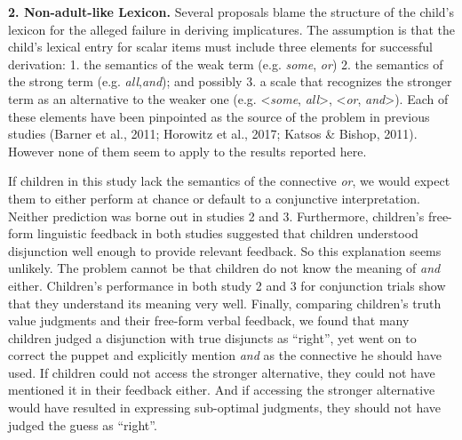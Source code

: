 \documentclass[floatsintext,man]{apa6}
\theoremstyle{definition}
\theoremstyle{definition}
\theoremstyle{definition}
\theoremstyle{remark}
\begin{document}
\textbf{2. Non-adult-like Lexicon.} Several proposals blame the
structure of the child's lexicon for the alleged failure in deriving
implicatures. The assumption is that the child's lexical entry for
scalar items must include three elements for successful derivation: 1.
the semantics of the weak term (e.g. \emph{some}, \emph{or}) 2. the
semantics of the strong term (e.g. \emph{all},\emph{and}); and possibly
3. a scale that recognizes the stronger term as an alternative to the
weaker one (e.g. \textless{}\emph{some}, \emph{all}\textgreater{},
\textless{}\emph{or}, \emph{and}\textgreater{}). Each of these elements
have been pinpointed as the source of the problem in previous studies
(Barner et al., 2011; Horowitz et al., 2017; Katsos \& Bishop, 2011).
However none of them seem to apply to the results reported here.

If children in this study lack the semantics of the connective
\emph{or}, we would expect them to either perform at chance or default
to a conjunctive interpretation. Neither prediction was borne out in
studies 2 and 3. Furthermore, children's free-form linguistic feedback
in both studies suggested that children understood disjunction well
enough to provide relevant feedback. So this explanation seems unlikely.
The problem cannot be that children do not know the meaning of
\emph{and} either. Children's performance in both study 2 and 3 for
conjunction trials show that they understand its meaning very well.
Finally, comparing children's truth value judgments and their free-form
verbal feedback, we found that many children judged a disjunction with
true disjuncts as \enquote{right}, yet went on to correct the puppet and
explicitly mention \emph{and} as the connective he should have used. If
children could not access the stronger alternative, they could not have
mentioned it in their feedback either. And if accessing the stronger
alternative would have resulted in expressing sub-optimal judgments,
they should not have judged the guess as \enquote{right}.
\end{document}
